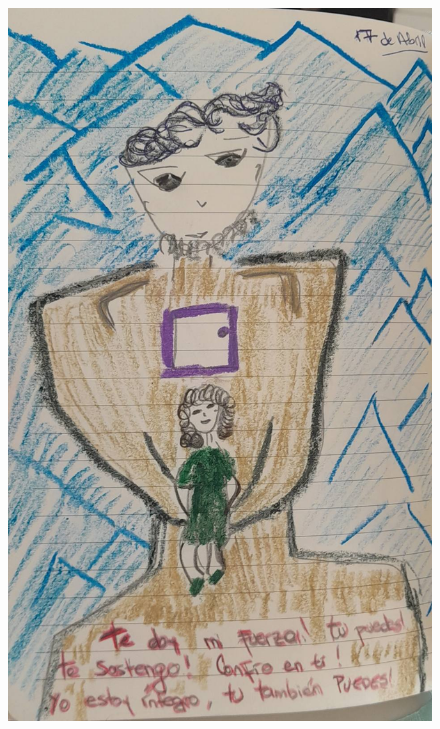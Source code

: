 \documentclass[12pt, a4paper, twoside]{book} %
\begin{document}
\begin{figure}[H]
	\centering
	\includegraphics[scale=0.3]{./images/1f81324dd896f4.jpg}
\end{figure}
\end{document}
